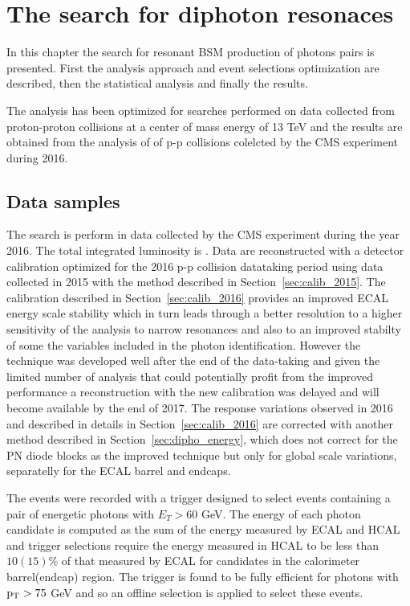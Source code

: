\chapter{The search for diphoton resonaces}
\label{chapter:diphotons}

In this chapter the search for resonant BSM production of photons pairs is presented.
First the analysis approach and event selections optimization are described, then
the statistical analysis and finally the results.

The analysis has been optimized for searches performed on data collected from proton-proton
collisions at a center of mass energy of 13 TeV and the results are obtained from the analysis
of \lumisix of p-p collisions colelcted by the CMS experiment during 2016. 


\section{Data samples}
\label{sec:diphotons_data_samples}
The search is perform in data collected by the CMS experiment during the year 2016. The total
integrated luminosity is \lumisix. Data are reconstructed with a detector calibration optimized
for the 2016 p-p collision datataking period using data collected in 2015 with the method described in
Section~\ref{sec:calib_2015}. The calibration described in Section~\ref{sec:calib_2016}
provides an improved ECAL energy scale stability which in turn leads through a better resolution
to a higher sensitivity of the analysis to narrow resonances and also to an improved stabilty
of some the variables included in the photon identification. However the technique was developed
well after the end of the data-taking and given the limited number of analysis that could potentially
profit from the improved performance a reconstruction with the new calibration was delayed and will become
available by the end of 2017. The response variations observed in 2016 and described in details in Section~\ref{sec:calib_2016}
are corrected with another method described in Section~\ref{sec:dipho_energy},
which does not correct for the PN diode blocks as the improved technique but only for global scale variations, separatelly
for the ECAL barrel and endcaps.

The events were recorded with a trigger designed to select events containing a pair of
energetic photons with $E_T > 60$ GeV. The energy of each photon candidate is computed as
the sum of the energy measured by ECAL and HCAL and trigger selections require
the energy measured in HCAL to be less than $10(15)\%$ of that measured by ECAL for candidates
in the calorimeter barrel(endcap) region.
The trigger is found to be fully efficient for photons with $\mathrm{p_{T}} > 75$ GeV and so an offline
selection is applied to select these events.

